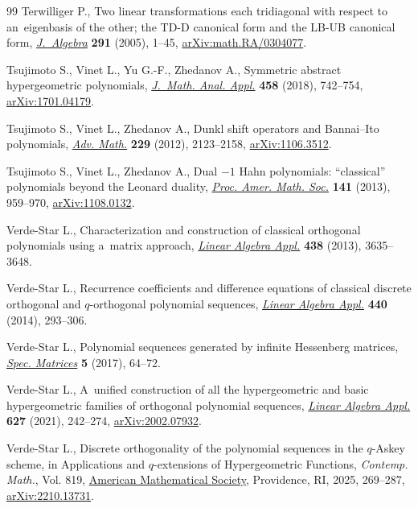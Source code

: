 \documentclass[pdftex]{sigma}
\numberwithin{equation}{section}
\begin{document}
\begin{thebibliography}{99}
Terwilliger P., Two linear transformations each tridiagonal with respect to
 an~eigenbasis of the other; the {TD}-{D} canonical form and the {LB}-{UB}
 canonical form,
 \href{https://doi.org/10.1016/j.jalgebra.2005.05.033}{\textit{J.~Algebra}}
 \textbf{291} (2005), 1--45,
 \href{http://arxiv.org/abs/math.RA/0304077}{arXiv:math.RA/0304077}.

Tsujimoto S., Vinet L., Yu G.-F., Zhedanov A., Symmetric abstract hypergeometric
 polynomials,
 \href{https://doi.org/10.1016/j.jmaa.2017.09.033}{\textit{J.~Math. Anal.
 Appl.}} \textbf{458} (2018), 742--754,
 \href{http://arxiv.org/abs/1701.04179}{arXiv:1701.04179}.

Tsujimoto S., Vinet L., Zhedanov A., Dunkl shift operators and {B}annai--{I}to
 polynomials, \href{https://doi.org/10.1016/j.aim.2011.12.020}{\textit{Adv.
 Math.}} \textbf{229} (2012), 2123--2158,
 \href{http://arxiv.org/abs/1106.3512}{arXiv:1106.3512}.

Tsujimoto S., Vinet L., Zhedanov A., Dual {$-1$} {H}ahn polynomials:
 ``classical'' polynomials beyond the {L}eonard duality,
 \href{https://doi.org/10.1090/S0002-9939-2012-11469-8}{\textit{Proc. Amer.
 Math. Soc.}} \textbf{141} (2013), 959--970,
 \href{http://arxiv.org/abs/1108.0132}{arXiv:1108.0132}.

Verde-Star L., Characterization and construction of classical orthogonal
 polynomials using a~matrix approach,
 \href{https://doi.org/10.1016/j.laa.2013.01.014}{\textit{Linear Algebra
 Appl.}} \textbf{438} (2013), 3635--3648.

Verde-Star L., Recurrence coefficients and difference equations of classical
 discrete orthogonal and {$q$}-orthogonal polynomial sequences,
 \href{https://doi.org/10.1016/j.laa.2013.10.051}{\textit{Linear Algebra
 Appl.}} \textbf{440} (2014), 293--306.

Verde-Star L., Polynomial sequences generated by infinite {H}essenberg
 matrices, \href{https://doi.org/10.1515/spma-2017-0002}{\textit{Spec.
 Matrices}} \textbf{5} (2017), 64--72.

Verde-Star L., A~unified construction of all the hypergeometric and basic
 hypergeometric families of orthogonal polynomial sequences,
 \href{https://doi.org/10.1016/j.laa.2021.06.012}{\textit{Linear Algebra
 Appl.}} \textbf{627} (2021), 242--274,
 \href{http://arxiv.org/abs/2002.07932}{arXiv:2002.07932}.

Verde-Star L., Discrete orthogonality of the polynomial sequences in the
 {$q$}-{A}skey scheme, in Applications and {$q$}-extensions of Hypergeometric
 Functions, \textit{Contemp. Math.}, Vol. 819,
 \href{https://doi.org/10.1090/conm/819/16398}{American Mathematical Society},
 Providence, RI, 2025, 269--287,
 \href{http://arxiv.org/abs/2210.13731}{arXiv:2210.13731}.


\end{thebibliography}
\end{document}
